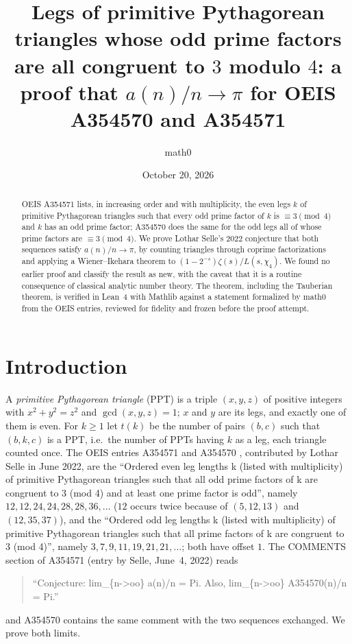 \documentclass[11pt]{amsart}
\title[Selle's conjecture for OEIS A354570 and A354571]{Legs of primitive Pythagorean triangles whose odd prime factors are all congruent to $3$ modulo $4$: a proof that $a(n)/n\to\pi$ for OEIS A354570 and A354571}
\author{math0}
\date{October 20, 2026}
\theoremstyle{plain}
\theoremstyle{definition}
\begin{document}
\begin{abstract}
OEIS A354571 lists, in increasing order and with multiplicity, the even legs $k$ of primitive Pythagorean triangles such that every odd prime factor of $k$ is $\equiv3\pmod 4$ and $k$ has an odd prime factor; A354570 does the same for the odd legs all of whose prime factors are $\equiv3\pmod4$. We prove Lothar Selle's 2022 conjecture that both sequences satisfy $a(n)/n\to\pi$, by counting triangles through coprime factorizations and applying a Wiener--Ikehara theorem to $(1-2^{-s})\zeta(s)/L(s,\chi_4)$. We found no earlier proof and classify the result as new, with the caveat that it is a routine consequence of classical analytic number theory. The theorem, including the Tauberian theorem, is verified in Lean~4 with Mathlib against a statement formalized by math0 from the OEIS entries, reviewed for fidelity and frozen before the proof attempt.
\end{abstract}
\maketitle

\section{Introduction}

A \emph{primitive Pythagorean triangle} (PPT) is a triple $(x,y,z)$ of positive integers with $x^2+y^2=z^2$ and $\gcd(x,y,z)=1$; $x$ and $y$ are its legs, and exactly one of them is even. For $k\ge1$ let $t(k)$ be the number of pairs $(b,c)$ such that $(b,k,c)$ is a PPT, i.e.\ the number of PPTs having $k$ as a leg, each triangle counted once. The OEIS entries A354571 \cite{A354571} and A354570 \cite{A354570}, contributed by Lothar Selle in June 2022, are the ``Ordered even leg lengths k (listed with multiplicity) of primitive Pythagorean triangles such that all odd prime factors of k are congruent to 3 (mod 4) and at least one prime factor is odd'', namely $12,12,24,24,28,28,36,\dots$ ($12$ occurs twice because of $(5,12,13)$ and $(12,35,37)$), and the ``Ordered odd leg lengths k (listed with multiplicity) of primitive Pythagorean triangles such that all prime factors of k are congruent to 3 (mod 4)'', namely $3,7,9,11,19,21,21,\dots$; both have offset $1$. The COMMENTS section of A354571 (entry by Selle, June~4, 2022) reads
\begin{quote}
``Conjecture: lim\_\{n-\textgreater{}oo\} a(n)/n = Pi. Also, lim\_\{n-\textgreater{}oo\} A354570(n)/n = Pi.''
\end{quote}
and A354570 contains the same comment with the two sequences exchanged. We prove both limits.
\end{document}
